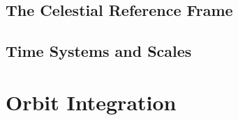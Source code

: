 \documentclass[12pt,a4paper,twoside]{report}
\begin{document}
    \section{The Celestial Reference Frame}
      
      
      
      
    
    \section{Time Systems and Scales}
      
      

\chapter{Orbit Integration}\label{ch:orbit-integration}
    
    
    
%
%
%
%
%
%
%

%
%
%
%
%
%
%

% 
%
\printbibliography

\glsaddall
\printglossary[type=\acronymtype,title=Acronyms]

\end{document}
